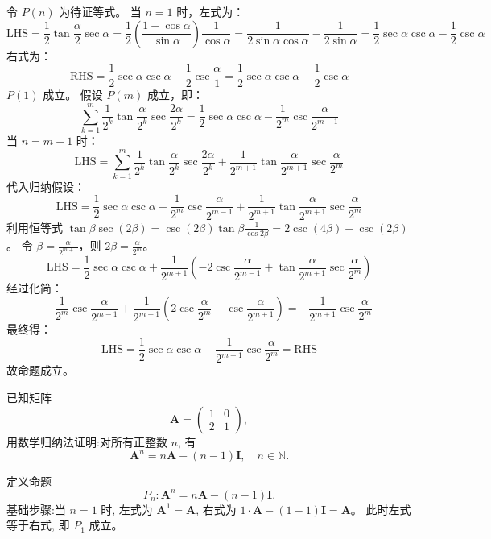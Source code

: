 \begin{questions}
\begin{solution}
令 $P(n)$ 为待证等式。
当 $n=1$ 时，左式为：
\[
\text{LHS} = \frac{1}{2} \tan \frac{\alpha}{2} \sec \alpha = \frac{1}{2} \left( \frac{1 - \cos \alpha}{\sin \alpha} \right) \frac{1}{\cos \alpha} = \frac{1}{2 \sin \alpha \cos \alpha} - \frac{1}{2 \sin \alpha} = \frac{1}{2} \sec \alpha \csc \alpha - \frac{1}{2} \csc \alpha
\]
右式为：
\[
\text{RHS} = \frac{1}{2} \sec \alpha \csc \alpha - \frac{1}{2} \csc \frac{\alpha}{1} = \frac{1}{2} \sec \alpha \csc \alpha - \frac{1}{2} \csc \alpha
\]
$P(1)$ 成立。
假设 $P(m)$ 成立，即：
\[
\sum_{k=1}^{m} \frac{1}{2^k} \tan \frac{\alpha}{2^k} \sec \frac{2\alpha}{2^k} = \frac{1}{2} \sec \alpha \csc \alpha - \frac{1}{2^m} \csc \frac{\alpha}{2^{m-1}}
\]
当 $n=m+1$ 时：
\[
\text{LHS} = \sum_{k=1}^{m} \frac{1}{2^k} \tan \frac{\alpha}{2^k} \sec \frac{2\alpha}{2^k} + \frac{1}{2^{m+1}} \tan \frac{\alpha}{2^{m+1}} \sec \frac{\alpha}{2^m}
\]
代入归纳假设：
\[
\text{LHS} = \frac{1}{2} \sec \alpha \csc \alpha - \frac{1}{2^m} \csc \frac{\alpha}{2^{m-1}} + \frac{1}{2^{m+1}} \tan \frac{\alpha}{2^{m+1}} \sec \frac{\alpha}{2^m}
\]
利用恒等式 $\tan \beta \sec(2\beta) = \csc(2\beta) \tan \beta \frac{1}{\cos 2\beta} = 2 \csc(4\beta) - \csc(2\beta)$。
令 $\beta = \frac{\alpha}{2^{m+1}}$，则 $2\beta = \frac{\alpha}{2^m}$。
\[
\text{LHS} = \frac{1}{2} \sec \alpha \csc \alpha + \frac{1}{2^{m+1}} \left( -2 \csc \frac{\alpha}{2^{m-1}} + \tan \frac{\alpha}{2^{m+1}} \sec \frac{\alpha}{2^m} \right)
\]
经过化简：
\[
- \frac{1}{2^m} \csc \frac{\alpha}{2^{m-1}} + \frac{1}{2^{m+1}} \left( 2 \csc \frac{\alpha}{2^m} - \csc \frac{\alpha}{2^{m+1}} \right) = - \frac{1}{2^{m+1}} \csc \frac{\alpha}{2^m}
\]
最终得：
\[
\text{LHS} = \frac{1}{2} \sec \alpha \csc \alpha - \frac{1}{2^{m+1}} \csc \frac{\alpha}{2^m} = \text{RHS}
\]
故命题成立。
\end{solution}

    \question 已知矩阵
    \[
    \mathbf{A} = \begin{pmatrix} 1 & 0 \\ 2 & 1 \end{pmatrix},
    \]
    用数学归纳法证明:对所有正整数 $n$, 有
    \[
    \mathbf{A}^n = n\mathbf{A} - (n-1)\mathbf{I}, \quad n \in \mathbb{N}.
    \]
    \begin{solution}
        定义命题
        \[
        P_n:\mathbf{A}^n = n\mathbf{A} - (n-1)\mathbf{I}.
        \]
        基础步骤:当 $n=1$ 时, 左式为 $\mathbf{A}^1 = \mathbf{A}$, 右式为 $1\cdot\mathbf{A} - (1-1)\mathbf{I} = \mathbf{A}$。
        此时左式等于右式, 即 $P_1$ 成立。


\end{solution}
\end{questions}
